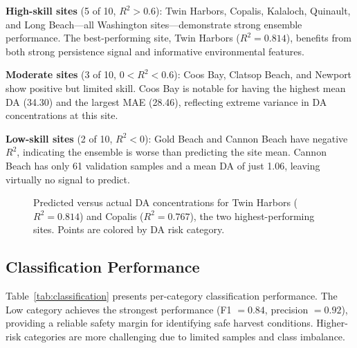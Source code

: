 \documentclass[preprint,12pt,authoryear]{elsarticle}
\begin{document}
\textbf{High-skill sites} (5 of 10, $R^2 > 0.6$): Twin Harbors, Copalis, Kalaloch, Quinault, and Long Beach---all Washington sites---demonstrate strong ensemble performance. The best-performing site, Twin Harbors ($R^2 = 0.814$), benefits from both strong persistence signal and informative environmental features.

\textbf{Moderate sites} (3 of 10, $0 < R^2 < 0.6$): Coos Bay, Clatsop Beach, and Newport show positive but limited skill. Coos Bay is notable for having the highest mean DA (\SI{34.30}{\microgrampeg}) and the largest MAE (\SI{28.46}{\microgrampeg}), reflecting extreme variance in DA concentrations at this site.

\textbf{Low-skill sites} (2 of 10, $R^2 < 0$): Gold Beach and Cannon Beach have negative $R^2$, indicating the ensemble is worse than predicting the site mean. Cannon Beach has only 61 validation samples and a mean DA of just \SI{1.06}{\microgrampeg}, leaving virtually no signal to predict.

\begin{figure}[!htbp]
\centering
{}
\caption{Predicted versus actual DA concentrations for Twin Harbors ($R^2 = 0.814$) and Copalis ($R^2 = 0.767$), the two highest-performing sites. Points are colored by DA risk category.}
\label{fig:scatter-best}
\end{figure}

\subsection{Classification Performance}
\label{sec:results-classification}

Table~\ref{tab:classification} presents per-category classification performance. The Low category achieves the strongest performance (F1 $= 0.84$, precision $= 0.92$), providing a reliable safety margin for identifying safe harvest conditions. Higher-risk categories are more challenging due to limited samples and class imbalance.
\end{document}
